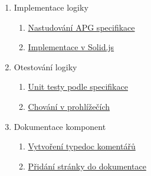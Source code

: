 \begin{enumerate}[label=\arabic*.]
\begin{enumerate}[label*=\arabic*.]
\begin{enumerate}[label*=\arabic*.]
                        \item Implementace logiky
                              \begin{enumerate}[label*=\arabic*.]
                                  \item \ul{Nastudování APG specifikace}
                                  \item \ul{Implementace v Solid.js}
                              \end{enumerate}
                        \item Otestování logiky
                              \begin{enumerate}[label*=\arabic*.]
                                  \item \ul{Unit testy podle specifikace}
                                  \item \ul{Chování v prohlížečích}
                              \end{enumerate}
                        \item Dokumentace komponent
                              \begin{enumerate}[label*=\arabic*.]
                                  \item \ul{Vytvoření typedoc komentářů}
                                  \item \ul{Přidání stránky do dokumentace}
                              \end{enumerate}
                    \end{enumerate}
          \end{enumerate}
\end{enumerate}

